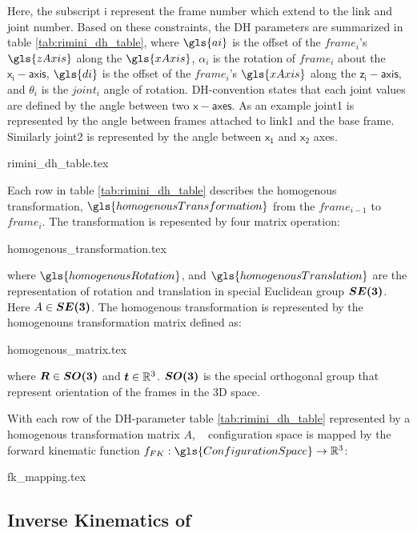 Here, the subscript $\mathsf{i}$ represent the frame number which extend to the link and joint number. 
Based on these constraints, the DH parameters are summarized in table \ref{tab:rimini_dh_table},
where $\gls{ai}$ is the offset of the $frame_i$'s $\gls{zAxis}$ along the $\gls{xAxis}$, $\alpha_i$
is the rotation of $frame_i$ about the $\mathsf{x_i-axis}$, $\gls{di}$ is the offset of the
$frame_i$'s $\gls{xAxis}$ along the $\mathsf{z_i-axis}$, and $\theta_i$ is the $joint_i$ angle of rotation. 
DH-convention states that each joint values are defined by the angle between two $\mathsf{x-axes}$. As an
example joint1 is represented by the angle between frames attached to link1
and the base frame. Similarly joint2 is represented by the angle between $\mathsf{x_1}$
and $\mathsf{x_2}$ axes.


  {rimini_dh_table.tex}

Each row in table \ref{tab:rimini_dh_table} describes the homogenous transformation, 
$\gls{homogenousTransformation}$ from the 
$frame_{i-1}$ to $frame_i$. The transformation is repesented by four matrix operation:

  {homogenous_transformation.tex}

where $\gls{homogenousRotation}$, and $\gls{homogenousTranslation}$ are the representation of rotation and translation in special
Euclidean group $\vb*{SE(3)}$. Here $A\in\vb*{SE(3)}$. 
The homogenous transformation
is represented by the homogenouns transformation matrix defined as: 

{homogenous_matrix.tex}

where $\vb*{R} \in \vb*{SO(3)}$ and $\vb*{t} \in \mathbb{R}^3$.
$\vb*{SO(3)}$ is the special orthogonal group that represent
orientation of the frames in the 3D space.

With each row of the DH-parameter table \ref{tab:rimini_dh_table} represented
by a homogenous transformation matrix $A$, \rimini~ configuration
space is mapped by the forward kinematic function $f_{FK}:\gls{ConfigurationSpace} \to \mathbb{R}^3$:

  {fk_mapping.tex}

\subsection{Inverse Kinematics of \rimini}\label{sec:ik_rimini}

